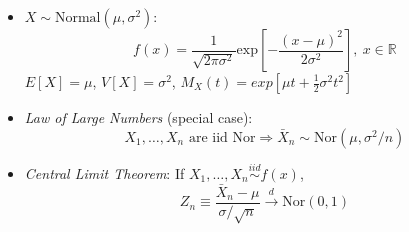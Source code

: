 \documentclass[10pt, twocolumn]{article}
\begin{document}
\begin{itemize}
\item $X\sim \text{Normal}(\mu,\sigma^2)$: 
\[ f(x) = \frac{1}{\sqrt{2\pi\sigma^2}}\text{exp}\left[-\frac{(x-\mu)^2}{2\sigma^2}\right],\ x\in\mathbb{R} \]
$E[X]=\mu$, $V[X]=\sigma^2$, $M_X(t)=exp[\mu t+\frac{1}{2}\sigma^2t^2]$
\item \emph{Law of Large Numbers} (special case): 
\[ X_1,\dots,X_n \text{ are iid Nor} \Rightarrow \bar{X}_n\sim \text{Nor}(\mu,\sigma^2/n) \]
\item \emph{Central Limit Theorem}: If $X_1,\dots,X_n\stackrel{iid}{\sim}f(x)$, 
\[ Z_n\equiv \frac{\bar{X}_n-\mu}{\sigma/\sqrt{n}}\stackrel{d}{\longrightarrow}\text{Nor}(0,1) \]
\end{itemize}
\end{document}
